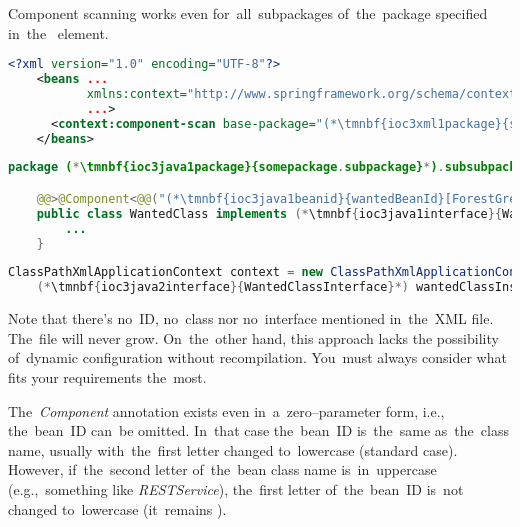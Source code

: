 Component scanning works even for~all~subpackages of~the~package specified in~the~ element.
\newpage

\begin{lstlisting}[language=XML, title={Configuration XML}]
    <?xml version="1.0" encoding="UTF-8"?>
    <beans ...
           xmlns:context="http://www.springframework.org/schema/context"
           ...>
      <context:component-scan base-package="(*\tmnbf{ioc3xml1package}{somepackage.subpackage}[ForestGreen]*)"/>
    </beans>
\end{lstlisting}
\begin{lstlisting}[language=Java, title={Wanted class}]
    package (*\tmnbf{ioc3java1package}{somepackage.subpackage}*).subsubpackage;

    @@>@Component<@@("(*\tmnbf{ioc3java1beanid}{wantedBeanId}[ForestGreen]*)")
    public class WantedClass implements (*\tmnbf{ioc3java1interface}{WantedClassInterface}*) {
        ...
    }
\end{lstlisting}
\begin{lstlisting}[language=Java, title={Usage}]
    ClassPathXmlApplicationContext context = new ClassPathXmlApplicationContext("configurationFile.xml");
    (*\tmnbf{ioc3java2interface}{WantedClassInterface}*) wantedClassInstance = context.getBean("(*\tmnbf{ioc3java2beanid}{wantedBeanId}[ForestGreen]*)", (*\tmnbf{ioc3java2interface2}{WantedClassInterface}*).class);
\end{lstlisting}

\noindent Note that there's no~ID, no~class nor no~interface mentioned in~the~XML file.
The~file will never grow.
On~the~other hand, this approach  lacks the possibility of~dynamic configuration without recompilation.
You~must always consider what fits your requirements the~most.

The~\textit{Component} annotation exists even in~a~zero--parameter form, i.e., the~bean~ID can~be omitted.
In~that case the~bean~ID is~the~same as~the~class name, usually with~the~first letter changed to~lowercase (standard case).
However, if~the~second letter of~the~bean class name is~in~uppercase (e.g.,~something like \textit{\mbox{RESTService}}), the~first letter of~the~bean~ID is~not changed to~lowercase (it~remains ).
\newpage

